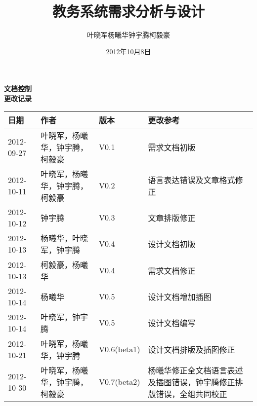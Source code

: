 \documentclass[a4paper,12pt]{article}
\begin{document}
\begin{CJK*}{UTF8}{stzhongsong}

\title{教务系统需求分析与设计}
\author{叶晓军\quad 杨曦华\quad 钟宇腾\quad 柯毅豪}
\date{2012年10月8日}



\noindent \textbf{\LARGE 文档控制}\\

\noindent \textbf{\large 更改记录}\\
\begin{table}[H]
  \begin{tabularx}{\textwidth}{|l|l|l|X|}
    \hline
    \textbf{日期} & \textbf{作者} & \textbf{版本} & \textbf{更改参考}\\
    \hline
    2012-09-27&叶晓军，杨曦华，钟宇腾，柯毅豪&V0.1&需求文档初版\\
    \hline
    2012-10-11&叶晓军，杨曦华，钟宇腾，柯毅豪&V0.2&语言表达错误及文章格式修正\\
    \hline
    2012-10-12&钟宇腾&V0.3&文章排版修正\\
    \hline
    2012-10-13&杨曦华，叶晓军，钟宇腾&V0.4&设计文档初版\\
    \hline
    2012-10-13&柯毅豪，杨曦华&V0.4&需求文档修正\\
    \hline
    2012-10-14&杨曦华&V0.5&设计文档增加插图\\
    \hline
    2012-10-14&叶晓军，钟宇腾&V0.5&设计文档编写\\
    \hline
    2012-10-21&叶晓军，杨曦华，钟宇腾&V0.6(beta1)&设计文档排版及插图修正\\
    \hline
    2012-10-30&叶晓军，杨曦华，钟宇腾，柯毅豪&V0.7(beta2)&杨曦华修正全文档语言表述及插图错误，钟宇腾修正排版错误，全组共同校正\\
    \hline
  \end{tabularx}
\end{table}

\newpage

\tableofcontents
\newpage

\pagestyle{fancy}

\newpage


\newpage


\newpage


\newpage
\end{CJK*}
\end{document}
